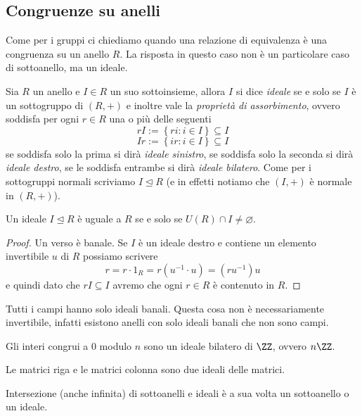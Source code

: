 \documentclass[11pt]{scrartcl}
\newcommand{\normal}{\mathrel{\unlhd}}
\newcommand{\eset}{\varnothing}
\begin{document}
	\subsection{Congruenze su anelli}
	Come per i gruppi ci chiediamo quando una relazione di equivalenza è una congruenza su un anello $R$. La risposta in questo caso non è un particolare caso di sottoanello, ma un ideale.
	\begin{definition}[Ideale]
		Sia $R$ un anello e $I\in R$ un suo sottoinsieme, allora $I$ si dice \textit{ideale} se e solo se $I$ è un sottogruppo di $(R,+)$ e inoltre vale la \textit{proprietà di assorbimento}, ovvero soddisfa per ogni $r\in R$ una o più delle seguenti 
		$$rI:=\left\{ri:i\in I\right\}\subseteq I$$
		$$Ir:=\left\{ir:i\in I\right\}\subseteq I$$
		se soddisfa solo la prima si dirà \textit{ideale sinistro}, se soddisfa solo la seconda si dirà \textit{ideale destro}, se le soddisfa entrambe si dirà \textit{ideale bilatero}. Come per i sottogruppi normali scriviamo $I\normal R$ (e in effetti notiamo che $(I,+)$ è normale in $(R,+)$).
	\end{definition}
	\begin{proposition}\label{anelli:ideale banale}
		Un ideale $I\normal R$ è uguale a $R$ se e solo se $U(R)\cap I\ne \eset$. 
	\end{proposition}
	\begin{proof}
		Un verso è banale. Se $I$ è un ideale destro e contiene un elemento invertibile $u$ di $R$ possiamo scrivere
		$$r=r\cdot 1_R=r(u^{-1}\cdot u)=(ru^{-1})u$$
		e quindi  dato che $rI\subseteq I$ avremo che ogni $r\in R$ è contenuto in $R$.  
	\end{proof}
	\begin{corollary}
		Tutti i campi hanno solo ideali banali. Questa cosa non è necessariamente invertibile, infatti esistono anelli con solo ideali banali che non sono campi.
	\end{corollary}
	\begin{example}
		Gli interi congrui a $0$ modulo $n$ sono un ideale bilatero di $\ZZ$, ovvero $n\ZZ$.
	\end{example}
	\begin{example}
		Le matrici riga e le matrici colonna sono due ideali delle matrici.
	\end{example}
	\begin{lemma}
		Intersezione (anche infinita) di sottoanelli e ideali è a sua volta un sottoanello o un ideale.
	\end{lemma}
\end{document}
